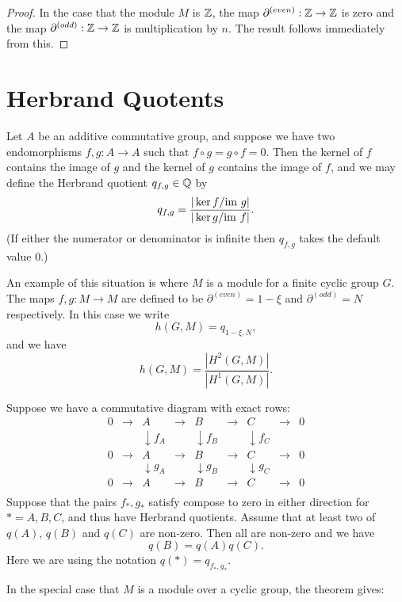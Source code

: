 \begin{proof}
  In the case that the module $M$ is $\mathbb Z$, the map $\partial^{(even)} : \mathbb Z \to \mathbb Z$ is zero
  and the map $\partial^{(odd)} : \mathbb Z\to \mathbb Z$ is multiplication by $n$.
  The result follows immediately from this.
\end{proof}


\section{Herbrand Quotents}

Let $A$ be an additive commutative group, and suppose we have two endomorphisms
$f,g : A \to A$ such that $f \circ g = g \circ f = 0$.
Then the kernel of $f$ contains the image of $g$ and the kernel of $g$ contains the image of $f$,
and we may define the Herbrand quotient $q_{f,g} \in \mathbb Q$ by
\[
  q_{f,g} = \frac{| \ker f / \mathrm {im}\  g|}{| \ker g / \mathrm {im}\  f|}.
\]
(If either the numerator or denominator is infinite then $q_{f,g}$ takes the default value $0$.)

An example of this situation is where $M$ is a module for a finite cyclic group $G$.
The maps $f,g : M \to M$ are defined to be $\partial^{(even)} = 1-\xi$ and $\partial^{(odd)} = N$
respectively.
In this case we write
\[
  h(G,M) = q_{1-\xi,N},
\]
and we have
\[
  h(G,M) = \frac{|H^2(G,M)|}{|H^1(G,M)|}.
\]

\begin{theorem}
  \label{Herbrand of short exact sequence}
  Suppose we have a commutative diagram with exact rows:
  \[
    \begin{matrix}
      0 &\to& A &\to& B &\to& C &\to& 0 \\
      &&\downarrow f_A &&\downarrow f_B &&\downarrow f_C \\
      0 &\to& A &\to& B &\to& C &\to& 0 \\
      &&\downarrow g_A &&\downarrow g_B &&\downarrow g_C \\
      0 &\to& A &\to& B &\to& C &\to& 0 \\
    \end{matrix}
  \]
  Suppose that the pairs $f_*,g_*$ satisfy compose to zero in either direction
  for $*=A,B,C$, and thus have Herbrand quotients.
  Assume that at least two of $q(A)$, $q(B)$ and $q(C)$ are non-zero.
  Then all are non-zero and we have
  \[
    q(B) = q(A) q(C).
  \]
  Here we are using the notation $q(*) = q_{f_*,g_*}$.
\end{theorem}


In the special case that $M$ is a module over a cyclic group, the theorem gives:

